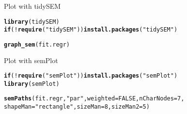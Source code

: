 \documentclass[10pt]{beamer}\usepackage[]{graphicx}\usepackage[]{xcolor}
\makeatletter
\newcommand{\hlnum}[1]{\textcolor[rgb]{0.686,0.059,0.569}{#1}}%
\newcommand{\hlsng}[1]{\textcolor[rgb]{0.192,0.494,0.8}{#1}}%
\newcommand{\hlopt}[1]{\textcolor[rgb]{0,0,0}{#1}}%
\newcommand{\hldef}[1]{\textcolor[rgb]{0.345,0.345,0.345}{#1}}%
\newcommand{\hlkwa}[1]{\textcolor[rgb]{0.161,0.373,0.58}{\textbf{#1}}}%
\newcommand{\hlkwc}[1]{\textcolor[rgb]{0.333,0.667,0.333}{#1}}%
\newcommand{\hlkwd}[1]{\textcolor[rgb]{0.737,0.353,0.396}{\textbf{#1}}}%
\newenvironment{kframe}{%
 \def\at@end@of@kframe{}%
 \ifinner\ifhmode%
  \def\at@end@of@kframe{\end{minipage}}%
  \begin{minipage}{\columnwidth}%
 \fi\fi%
 \def\FrameCommand##1{\hskip\@totalleftmargin \hskip-\fboxsep
 \colorbox{shadecolor}{##1}\hskip-\fboxsep
     \hskip-\linewidth \hskip-\@totalleftmargin \hskip\columnwidth}%
 \MakeFramed {\advance\hsize-\width
   \@totalleftmargin\z@ \linewidth\hsize
   \@setminipage}}%
 {\par\unskip\endMakeFramed%
 \at@end@of@kframe}
\newenvironment{knitrout}{}{} %
\makeatother
\begin{document}
%
\begin{frame}[fragile]{Plot with tidySEM}
\begin{knitrout}
\color{fgcolor}\begin{kframe}
\begin{alltt}
\hlkwd{library}\hldef{(tidySEM)}
\hlkwa{if} \hldef{(}\hlopt{!}\hlkwd{require}\hldef{(}\hlsng{"tidySEM"}\hldef{))} \hlkwd{install.packages}\hldef{(}\hlsng{"tidySEM"}\hldef{)}
\end{alltt}
\end{kframe}
\end{knitrout}
\begin{knitrout}
\color{fgcolor}\begin{kframe}
\begin{alltt}
\hlkwd{graph_sem}\hldef{(fit.regr)}
\end{alltt}
\end{kframe}
\end{knitrout}
\end{frame}
%
\begin{frame}[fragile]{Plot with semPlot}

\begin{knitrout}
\color{fgcolor}\begin{kframe}
\begin{alltt}
\hlkwa{if} \hldef{(}\hlopt{!}\hlkwd{require}\hldef{(}\hlsng{"semPlot"}\hldef{))} \hlkwd{install.packages}\hldef{(}\hlsng{"semPlot"}\hldef{)}
\hlkwd{library}\hldef{(semPlot)}
\end{alltt}
\end{kframe}
\end{knitrout}
\begin{knitrout}
\color{fgcolor}\begin{kframe}
\begin{alltt}
\hlkwd{semPaths}\hldef{(fit.regr,} \hlsng{"par"}\hldef{,} \hlkwc{weighted} \hldef{=} \hlnum{FALSE}\hldef{,} \hlkwc{nCharNodes} \hldef{=} \hlnum{7}\hldef{,}
         \hlkwc{shapeMan} \hldef{=} \hlsng{"rectangle"}\hldef{,} \hlkwc{sizeMan} \hldef{=} \hlnum{8}\hldef{,} \hlkwc{sizeMan2} \hldef{=} \hlnum{5}\hldef{)}
\end{alltt}
\end{kframe}
\end{knitrout}
\end{frame}
\end{document}
